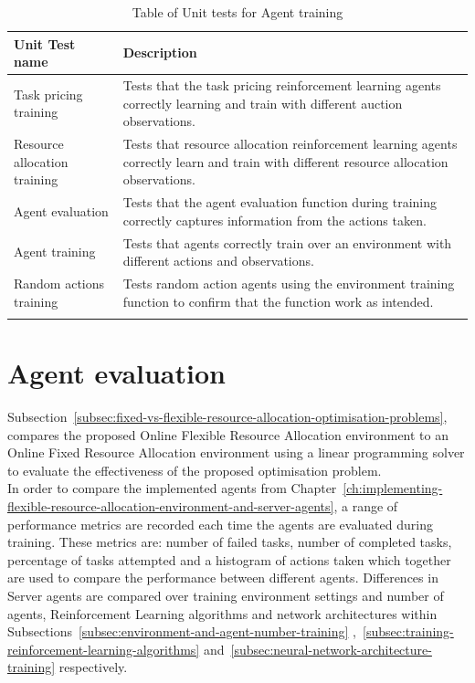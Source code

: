 \begin{longtable}{|p{3cm}|p{11cm}|} \hline
    \textbf{Unit Test name} & \textbf{Description} \\ \hline
    Task pricing training & Tests that the task pricing reinforcement learning agents correctly learning and train
        with different auction observations. \\ \hline
    Resource allocation training & Tests that resource allocation reinforcement learning agents correctly learn and
        train with different resource allocation observations. \\ \hline
    Agent evaluation & Tests that the agent evaluation function during training correctly captures information from the
        actions taken. \\ \hline
    Agent training & Tests that agents correctly train over an environment with different actions and observations.
        \\ \hline
    Random actions training & Tests random action agents using the environment training function to confirm
        that the function work as intended. \\ \hline
    \caption{Table of Unit tests for Agent training}
    \label{tab:training-unit-tests}
\end{longtable}

\section{Agent evaluation}
\label{sec:agent-evaluation}
Subsection~\ref{subsec:fixed-vs-flexible-resource-allocation-optimisation-problems},
compares the proposed Online Flexible Resource Allocation environment to an Online Fixed Resource Allocation
environment using a linear programming solver to evaluate the effectiveness of the proposed optimisation problem. \\
In order to compare the implemented agents from
Chapter~\ref{ch:implementing-flexible-resource-allocation-environment-and-server-agents}, a range of performance metrics
are recorded each time the agents are evaluated during training. These metrics are: number of failed tasks, number
of completed tasks, percentage of tasks attempted and a histogram of actions taken which together are used to compare
the performance between different agents. Differences in Server agents are compared over training environment settings
and number of agents, Reinforcement Learning algorithms and network architectures within
Subsections~\ref{subsec:environment-and-agent-number-training}
,~\ref{subsec:training-reinforcement-learning-algorithms} and~\ref{subsec:neural-network-architecture-training}
respectively.


